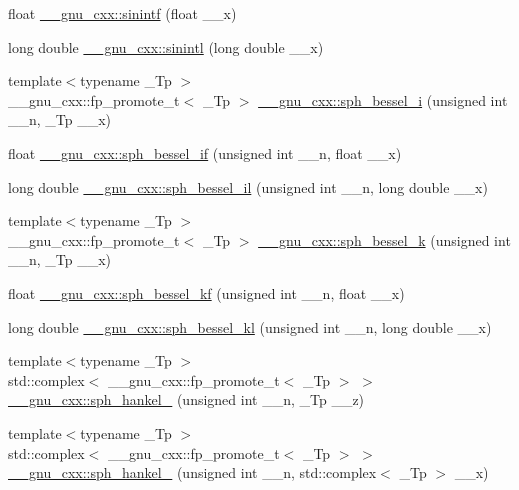 \begin{DoxyCompactItemize}
\item 
float \hyperlink{group__mathsf__gnu_ga8b63406fec50d7e00470521b82fb32a2}{\+\_\+\+\_\+gnu\+\_\+cxx\+::sinintf} (float \+\_\+\+\_\+x)
\item 
long double \hyperlink{group__mathsf__gnu_ga3ff83e5c5f1435064b6942ca8b7c8779}{\+\_\+\+\_\+gnu\+\_\+cxx\+::sinintl} (long double \+\_\+\+\_\+x)
\item 
{\footnotesize template$<$typename \+\_\+\+Tp $>$ }\\\+\_\+\+\_\+gnu\+\_\+cxx\+::fp\+\_\+promote\+\_\+t$<$ \+\_\+\+Tp $>$ \hyperlink{group__mathsf__gnu_ga156b8154b27b7898c8b2abf4284f7323}{\+\_\+\+\_\+gnu\+\_\+cxx\+::sph\+\_\+bessel\+\_\+i} (unsigned int \+\_\+\+\_\+n, \+\_\+\+Tp \+\_\+\+\_\+x)
\item 
float \hyperlink{group__mathsf__gnu_gacc6738f18c1ba19452b9dd814d11c00c}{\+\_\+\+\_\+gnu\+\_\+cxx\+::sph\+\_\+bessel\+\_\+if} (unsigned int \+\_\+\+\_\+n, float \+\_\+\+\_\+x)
\item 
long double \hyperlink{group__mathsf__gnu_gaf4392d9ed177913febdcbfccb947dbca}{\+\_\+\+\_\+gnu\+\_\+cxx\+::sph\+\_\+bessel\+\_\+il} (unsigned int \+\_\+\+\_\+n, long double \+\_\+\+\_\+x)
\item 
{\footnotesize template$<$typename \+\_\+\+Tp $>$ }\\\+\_\+\+\_\+gnu\+\_\+cxx\+::fp\+\_\+promote\+\_\+t$<$ \+\_\+\+Tp $>$ \hyperlink{group__mathsf__gnu_ga288b28f2c6995d052a4f5f17293cbf1a}{\+\_\+\+\_\+gnu\+\_\+cxx\+::sph\+\_\+bessel\+\_\+k} (unsigned int \+\_\+\+\_\+n, \+\_\+\+Tp \+\_\+\+\_\+x)
\item 
float \hyperlink{group__mathsf__gnu_gaf886e8f8dfd2af0c4a9c5929d193d12f}{\+\_\+\+\_\+gnu\+\_\+cxx\+::sph\+\_\+bessel\+\_\+kf} (unsigned int \+\_\+\+\_\+n, float \+\_\+\+\_\+x)
\item 
long double \hyperlink{group__mathsf__gnu_ga22f6a73e50e7020a7c2fa64ce1b9be41}{\+\_\+\+\_\+gnu\+\_\+cxx\+::sph\+\_\+bessel\+\_\+kl} (unsigned int \+\_\+\+\_\+n, long double \+\_\+\+\_\+x)
\item 
{\footnotesize template$<$typename \+\_\+\+Tp $>$ }\\std\+::complex$<$ \+\_\+\+\_\+gnu\+\_\+cxx\+::fp\+\_\+promote\+\_\+t$<$ \+\_\+\+Tp $>$ $>$ \hyperlink{group__mathsf__gnu_ga4424f565fb224ab88b177beb65d08305}{\+\_\+\+\_\+gnu\+\_\+cxx\+::sph\+\_\+hankel\+\_} (unsigned int \+\_\+\+\_\+n, \+\_\+\+Tp \+\_\+\+\_\+z)
\item 
{\footnotesize template$<$typename \+\_\+\+Tp $>$ }\\std\+::complex$<$ \+\_\+\+\_\+gnu\+\_\+cxx\+::fp\+\_\+promote\+\_\+t$<$ \+\_\+\+Tp $>$ $>$ \hyperlink{group__mathsf__gnu_ga3d256857c000a966e89526cb99253aca}{\+\_\+\+\_\+gnu\+\_\+cxx\+::sph\+\_\+hankel\+\_} (unsigned int \+\_\+\+\_\+n, std\+::complex$<$ \+\_\+\+Tp $>$ \+\_\+\+\_\+x)

\end{DoxyCompactItemize}
